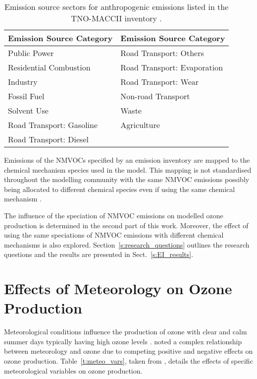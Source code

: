 {%
    \renewcommand{\arraystretch}{1.1}%
    \begin{table}[t]%
        \centering%
        \caption[Categories of emission source sectors]{Emission source sectors for anthropogenic emissions listed in the TNO-MACCII inventory \citep{Kuenen:2014}.}%
        \vspace{3mm}
        \begin{tabular}{ll}%
            \hline \hline
            \textbf{Emission Source Category} & \textbf{Emission Source Category} \\
            \hline \hline
            Public Power & Road Transport: Others \\
            Residential Combustion & Road Transport: Evaporation \\
            Industry & Road Transport: Wear \\
            Fossil Fuel & Non-road Transport \\
            Solvent Use & Waste \\
            Road Transport: Gasoline & Agriculture \\
            Road Transport: Diesel & \\ 
            \hline \hline
        \end{tabular}%
        \vspace{5mm}
        \label{t:SNAP}%
    \end{table}%
}

Emissions of the NMVOCs specified by an emission inventory are mapped to the chemical mechanism species used in the model.
This mapping is not standardised throughout the modelling community with the same NMVOC emissions possibly being allocated to different chemical species even if using the same chemical mechanism \citep{Carter:2015}.

The influence of the speciation of NMVOC emissions on modelled ozone production is determined in the second part of this work.
Moreover, the effect of using the same speciations of NMVOC emissions with different chemical mechanisms is also explored.
Section~\ref{s:research_questions} outlines the research questions and the results are presented in Sect.~\ref{s:EI_results}.

\section{Effects of Meteorology on Ozone Production} \label{s:meteo_ozone}
Meteorological conditions influence the production of ozone with clear and calm summer days typically having high ozone levels \citep{Duenas:2002}.
\citet{Comrie:1997} noted a complex relationship between meteorology and ozone due to competing positive and negative effects on ozone production.
Table~\ref{t:meteo_vars}, taken from \citet{Jacob:2009}, details the effects of specific meteorological variables on ozone production.

